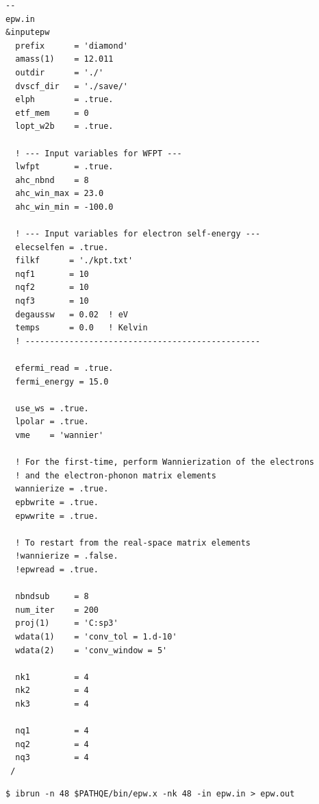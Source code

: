 \documentclass[a4paper,11pt,serif]{article}
\begin{document}
\begin{scriptsize}
 \begin{Verbatim}[frame=single]
--                                                                                                 epw.in
&inputepw
  prefix      = 'diamond'
  amass(1)    = 12.011
  outdir      = './'
  dvscf_dir   = './save/'
  elph        = .true.
  etf_mem     = 0
  lopt_w2b    = .true.

  ! --- Input variables for WFPT ---
  lwfpt       = .true.
  ahc_nbnd    = 8
  ahc_win_max = 23.0
  ahc_win_min = -100.0

  ! --- Input variables for electron self-energy ---
  elecselfen = .true.
  filkf      = './kpt.txt'
  nqf1       = 10
  nqf2       = 10
  nqf3       = 10
  degaussw   = 0.02  ! eV
  temps      = 0.0   ! Kelvin
  ! ------------------------------------------------

  efermi_read = .true.
  fermi_energy = 15.0

  use_ws = .true.
  lpolar = .true.
  vme    = 'wannier'

  ! For the first-time, perform Wannierization of the electrons
  ! and the electron-phonon matrix elements
  wannierize = .true.
  epbwrite = .true.
  epwwrite = .true.

  ! To restart from the real-space matrix elements
  !wannierize = .false.
  !epwread = .true.

  nbndsub     = 8
  num_iter    = 200
  proj(1)     = 'C:sp3'
  wdata(1)    = 'conv_tol = 1.d-10'
  wdata(2)    = 'conv_window = 5'

  nk1         = 4
  nk2         = 4
  nk3         = 4

  nq1         = 4
  nq2         = 4
  nq3         = 4
 /
\end{Verbatim}
\end{scriptsize}

\begin{verbatim}
$ ibrun -n 48 $PATHQE/bin/epw.x -nk 48 -in epw.in > epw.out
\end{verbatim}
\end{document}

